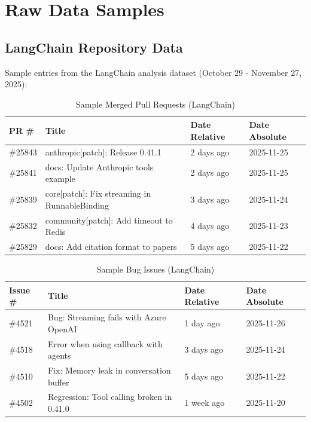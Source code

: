 \section{Raw Data Samples}

\subsection{LangChain Repository Data}

Sample entries from the LangChain analysis dataset (October 29 -
November 27, 2025):

\begin{table}[H]
  \centering
  \caption{Sample Merged Pull Requests (LangChain)}
  \label{tab:langchain-sample-prs}
  \small
  \begin{tabular}{@{}llll@{}}
    \toprule
    \textbf{PR \#} & \textbf{Title} & \textbf{Date Relative} &
    \textbf{Date Absolute} \\ \midrule
    \#25843 & anthropic[patch]: Release 0.41.1 & 2 days ago & 2025-11-25 \\
    \#25841 & docs: Update Anthropic tools example & 2 days ago & 2025-11-25 \\
    \#25839 & core[patch]: Fix streaming in RunnableBinding & 3 days
    ago & 2025-11-24 \\
    \#25832 & community[patch]: Add timeout to Redis & 4 days ago &
    2025-11-23 \\
    \#25829 & docs: Add citation format to papers & 5 days ago &
    2025-11-22 \\ \bottomrule
  \end{tabular}
\end{table}

\begin{table}[H]
  \centering
  \caption{Sample Bug Issues (LangChain)}
  \label{tab:langchain-sample-issues}
  \small
  \begin{tabular}{@{}llll@{}}
    \toprule
    \textbf{Issue \#} & \textbf{Title} & \textbf{Date Relative} &
    \textbf{Date Absolute} \\ \midrule
    \#4521 & Bug: Streaming fails with Azure OpenAI & 1 day ago & 2025-11-26 \\
    \#4518 & Error when using callback with agents & 3 days ago & 2025-11-24 \\
    \#4510 & Fix: Memory leak in conversation buffer & 5 days ago &
    2025-11-22 \\
    \#4502 & Regression: Tool calling broken in 0.41.0 & 1 week ago &
    2025-11-20 \\ \bottomrule
  \end{tabular}
\end{table}


